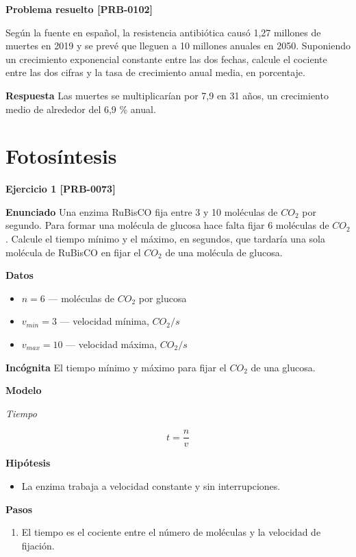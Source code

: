 \documentclass{book}
\begin{document}
\noindent\textbf{Problema resuelto [PRB-0102]}

Según la fuente en español, la resistencia antibiótica causó 1,27 millones de muertes en 2019 y se prevé que lleguen a 10 millones anuales en 2050. Suponiendo un crecimiento exponencial constante entre las dos fechas, calcule el cociente entre las dos cifras y la tasa de crecimiento anual media, en porcentaje.


\noindent\textbf{Respuesta}
Las muertes se multiplicarían por 7,9 en 31 años, un crecimiento medio de alrededor del 6,9 \% anual.


\section{Fotosíntesis}

\noindent\textbf{Ejercicio 1 [PRB-0073]}

\noindent\textbf{Enunciado}
Una enzima RuBisCO fija entre 3 y 10 moléculas de \(CO_{2}\) por segundo. Para formar una molécula de glucosa hace falta fijar 6 moléculas de \(CO_{2}\). Calcule el tiempo mínimo y el máximo, en segundos, que tardaría una sola molécula de RuBisCO en fijar el \(CO_{2}\) de una molécula de glucosa.


\noindent\textbf{Datos}
\begin{itemize}
\item $n = 6$ — moléculas de \(CO_{2}\) por glucosa
\item $v_{min} = 3$ — velocidad mínima, \(CO_{2}/s\)
\item $v_{max} = 10$ — velocidad máxima, \(CO_{2}/s\)
\end{itemize}

\noindent\textbf{Incógnita}
El tiempo mínimo y máximo para fijar el \(CO_{2}\) de una glucosa.


\noindent\textbf{Modelo}

\noindent\textit{Tiempo}

\[
t = \frac{n}{v}
\]

\noindent\textbf{Hipótesis}
\begin{itemize}
\item La enzima trabaja a velocidad constante y sin interrupciones.
\end{itemize}

\noindent\textbf{Pasos}
\begin{enumerate}
\item
El tiempo es el cociente entre el número de moléculas y la velocidad de fijación.

\end{enumerate}
\end{document}
